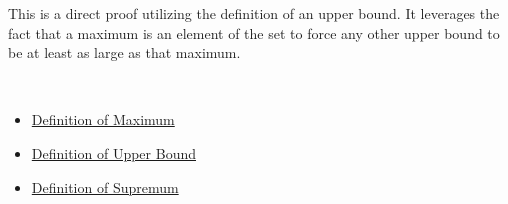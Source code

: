 \begin{remark*}
This is a direct proof utilizing the definition of an upper bound. It leverages the fact that a maximum is an element of the set to force any other upper bound to be at least as large as that maximum.
\end{remark*}

\begin{remark*}[Dependencies]~\\
\begin{itemize}
  \item \hyperref[pred:maximum]{Definition of Maximum}
  \item \hyperref[pred:upper-bound]{Definition of Upper Bound}
  \item \hyperref[pred:supremum]{Definition of Supremum}
\end{itemize}
\end{remark*}
